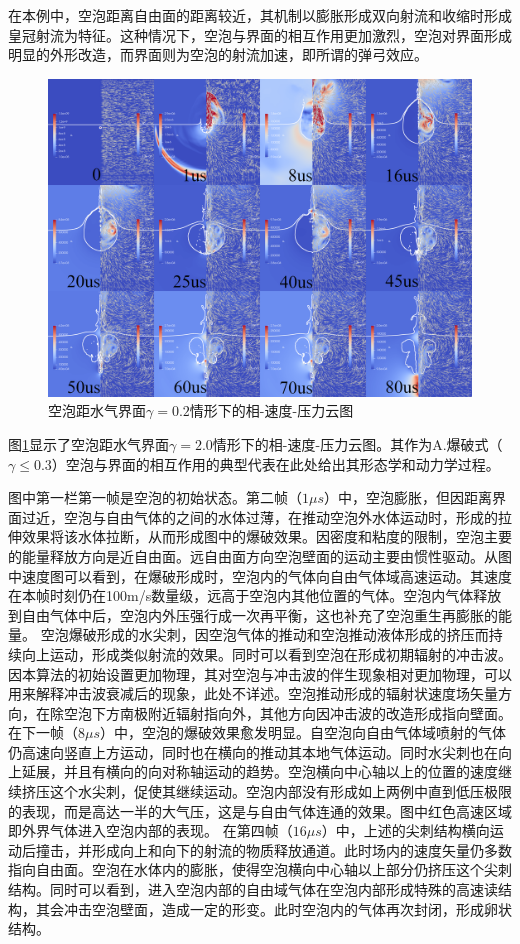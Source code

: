 在本例中，空泡距离自由面的距离较近，其机制以膨胀形成双向射流和收缩时形成皇冠射流为特征。这种情况下，空泡与界面的相互作用更加激烈，空泡对界面形成明显的外形改造，而界面则为空泡的射流加速，即所谓的弹弓效应。




\begin{figure}[h]
    \centering
    \includegraphics[width=0.9\linewidth]{img/fig3.air0.2.png}
    \caption{空泡距水气界面$\gamma=0.2$情形下的相-速度-压力云图}
    \label{fig3.air0.2pvp}
\end{figure}


图\ref{fig3.air0.2pvp}显示了空泡距水气界面$\gamma=2.0$情形下的相-速度-压力云图。其作为A.爆破式（$\gamma\leq 0.3$）空泡与界面的相互作用的典型代表在此处给出其形态学和动力学过程。

图中第一栏第一帧是空泡的初始状态。第二帧（$ 1\mu s$）中，空泡膨胀，但因距离界面过近，空泡与自由气体的之间的水体过薄，在推动空泡外水体运动时，形成的拉伸效果将该水体拉断，从而形成图中的爆破效果。因密度和粘度的限制，空泡主要的能量释放方向是近自由面。远自由面方向空泡壁面的运动主要由惯性驱动。从图中速度图可以看到，在爆破形成时，空泡内的气体向自由气体域高速运动。其速度在本帧时刻仍在100m/s数量级，远高于空泡内其他位置的气体。空泡内气体释放到自由气体中后，空泡内外压强行成一次再平衡，这也补充了空泡重生再膨胀的能量。
空泡爆破形成的水尖刺，因空泡气体的推动和空泡推动液体形成的挤压而持续向上运动，形成类似射流的效果。同时可以看到空泡在形成初期辐射的冲击波。因本算法的初始设置更加物理，其对空泡与冲击波的伴生现象相对更加物理，可以用来解释冲击波衰减后的现象，此处不详述。空泡推动形成的辐射状速度场矢量方向，在除空泡下方南极附近辐射指向外，其他方向因冲击波的改造形成指向壁面。
在下一帧（$ 8\mu s$）中，空泡的爆破效果愈发明显。自空泡向自由气体域喷射的气体仍高速向竖直上方运动，同时也在横向的推动其本地气体运动。同时水尖刺也在向上延展，并且有横向的向对称轴运动的趋势。空泡横向中心轴以上的位置的速度继续挤压这个水尖刺，促使其继续运动。空泡内部没有形成如上两例中直到低压极限的表现，而是高达一半的大气压，这是与自由气体连通的效果。图中红色高速区域即外界气体进入空泡内部的表现。
在第四帧（$ 16\mu s$）中，上述的尖刺结构横向运动后撞击，并形成向上和向下的射流的物质释放通道。此时场内的速度矢量仍多数指向自由面。空泡在水体内的膨胀，使得空泡横向中心轴以上部分仍挤压这个尖刺结构。同时可以看到，进入空泡内部的自由域气体在空泡内部形成特殊的高速读结构，其会冲击空泡壁面，造成一定的形变。此时空泡内的气体再次封闭，形成卵状结构。


